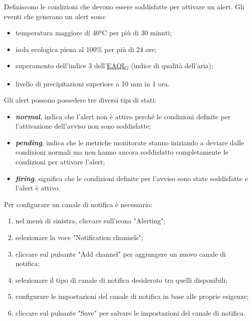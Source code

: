 Definiscono le condizioni che devono essere soddisfatte per attivare un alert. Gli eventi che generano un alert sono:
\begin{itemize}
	\item temperatura maggiore di 40°C per più di 30 minuti;
	\item isola ecologica piena al 100\% per più di 24 ore;
	\item superamento dell'indice 3 dell'\href{https://7last.github.io/docs/pb/documentazione-interna/glossario\#european-air-quality-index}{EAQI\textsubscript{G}} (indice di qualità dell'aria);
	\item livello di precipitazioni superiore a 10 mm in 1 ora.
\end{itemize}
Gli alert possono possedere tre diversi tipi di stati:
\begin{itemize}
	\item \textbf{\textit{normal}}, indica che l'alert non è attivo perché le condizioni definite per l'attivazione dell'avviso non sono soddisfatte;
	\item \textbf{\textit{pending}}, indica che le metriche monitorate stanno iniziando a deviare dalle condizioni normali ma non hanno ancora soddisfatto completamente le condizioni per attivare l'alert;
	\item \textbf{\textit{firing}}, significa che le condizioni definite per l'avviso sono state soddisfatte e l'alert è attivo.
\end{itemize}
Per configurare un canale di notifica è necessario:
\begin{enumerate}
	\item nel menù di sinistra, cliccare sull'icona "Alerting";
	\item selezionare la voce "Notification channels";
	\item cliccare sul pulsante "Add channel" per aggiungere un nuovo canale di notifica;
	\item selezionare il tipo di canale di notifica desiderato tra quelli disponibili;
	\item configurare le impostazioni del canale di notifica in base alle proprie esigenze;
	\item cliccare sul pulsante "Save" per salvare le impostazioni del canale di notifica.
\end{enumerate}


